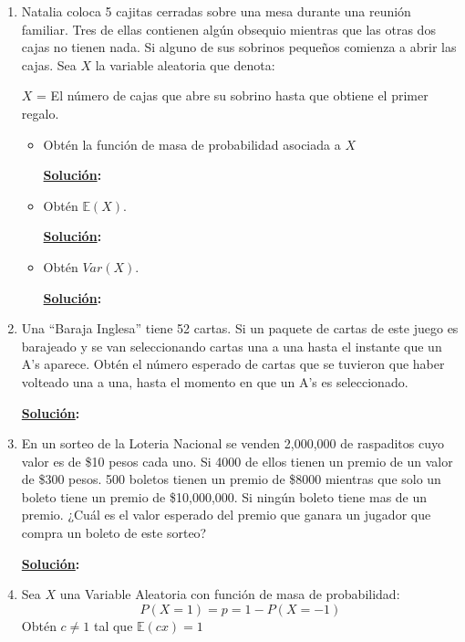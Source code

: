 \documentclass[11pt,letterpaper]{report}
\newcommand{\sol}{\textbf{\underline{Solución}: }} %
\begin{document}
\begin{enumerate}
\begin{itemize}
        \item Usa la Ley del ``Estadistico Inconsiente'' con la función $g(x) = |x|$.
        
        \sol
    \end{itemize}
    
\item Natalia coloca 5 cajitas cerradas sobre una mesa durante una reunión familiar. Tres de ellas
contienen algún obsequio mientras que las otras dos cajas no tienen nada. Si alguno de sus sobrinos
pequeños comienza a abrir las cajas. Sea $X$ la variable aleatoria que denota:
\begin{center}
    $X$ = El número de cajas que abre su sobrino hasta que obtiene el primer regalo.
\end{center}

\begin{itemize}
    \item Obtén la función de masa de probabilidad asociada a $X$
    
    \sol

    \item Obtén $\mathds{E}(X)$.
    
    \sol

    \item Obtén $Var(X)$.
    
    \sol
\end{itemize}

\item Una ``Baraja Inglesa'' tiene 52 cartas. Si un paquete de cartas de este juego es barajeado y
se van seleccionando cartas una a una hasta el instante que un A's aparece. Obtén el número esperado
de cartas que se tuvieron que haber volteado una a una, hasta el momento en que un A's es seleccionado.

\sol

\item En un sorteo de la Loteria Nacional se venden 2,000,000 de raspaditos cuyo valor es de \$10
pesos cada uno. Si 4000 de ellos tienen un premio de un valor de \$300 pesos. 500 boletos tienen un
premio de \$8000 mientras que solo un boleto tiene un premio de \$10,000,000. Si ningún boleto tiene
mas de un premio. ¿Cuál es el valor esperado del premio que ganara un jugador que compra un boleto
de este sorteo?

\sol

\item Sea $X$ una Variable Aleatoria con función de masa de probabilidad: 
\[
    P(X = 1) = p = 1 - P(X = -1)
\]
Obtén $c \not= 1$ tal que $\mathds{E}(cx)=1$


\end{enumerate}
\end{document}
